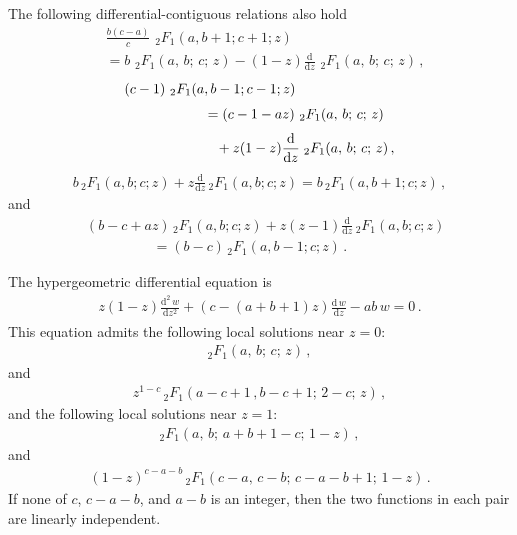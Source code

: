 \documentclass[aps,twocolumn,nofootinbib]{revtex4}
\begin{document}
{\begin{appendix}
The following differential-contiguous relations also hold
\begin{align} \label{contiguous-plus-app}
    & \frac{b(c-a)}{c}\,\,{}_2F_1(a,b+1;c+1;z)\nonumber\\
    &= b\,\,{}_2F_1(a,\, b;\, c;\, z) - (1-z)\frac{\mathrm{d}}{\mathrm{d}z}\,\,{}_2F_1(a,\, b;\, c;\, z)\,, 
\end{align}
\begin{align} \label{contiguous-minus-app}
    & (c-1)\,\,{}_2F_1(a,b-1;c-1;z)\nonumber\\[3pt]
    & \hspace{2cm} =(c-1-az)\,\,{}_2F_1(a,\, b;\, c;\, z) \nonumber\\[3pt]
    &\hspace{2.3cm}+ z(1-z)\frac{\mathrm{d}}{\mathrm{d}z}\; {}_2F_1(a,\, b;\, c;\, z)\,,
\end{align}
\begin{align} \label{contiguous-plus-app'}
    b\,{}_2F_1(a,b;c;z) + z\frac{\mathrm{d}}{\mathrm{d}z} \, {}_2F_1(a,b;c;z) = b\,{}_2F_1(a,b+1;c;z) \,,
\end{align}
and
\begin{align} \label{contiguous-minus-app'}
    &(b-c+az)\, {}_2F_1(a,b;c;z) + z(z-1) \frac{\mathrm{d}} {\mathrm{d}z}\, {}_2F_1(a,b;c;z) \nonumber\\[3pt]
    &\hspace{2cm} = (b-c)\, {}_2F_1(a,b-1;c;z) \,.
\end{align}

The hypergeometric differential equation is
\begin{align}\label{HG-eq}
    z(1-z)\frac{\mathrm{d}_{}^2\, w}{\mathrm{d}z_{}^2} + \left(c-(a+b+1)z\right)\frac{\mathrm{d}\, w}{\mathrm{d}z} - ab \,w= 0 \,.
\end{align}
This equation admits the following local solutions near $z=0$:
\begin{align}\label{o1}
    {}_2F_1(a,\, b;\, c;\, z)\,,
\end{align}
and
\begin{align}\label{o2}
    z^{1-c}\, {}_2F_1(a-c+1\,,b-c+1;\, 2-c;\, z)\,,
\end{align}
and the following local solutions near $z=1$:
\begin{align}\label{o3} 
    {}_2F_1(a,\, b;\, a+b+1-c;\, 1-z)\,,
\end{align}
and
\begin{align}\label{o4}
    (1-z)^{c-a-b}\, {}_2F_1(c-a,\, c-b;\, c-a-b+1;\, 1-z)\,.
\end{align}
If none of $c$, $c-a-b$, and $a-b$ is an integer, then the two functions in each pair are linearly independent.



\end{appendix}}
\end{document}
